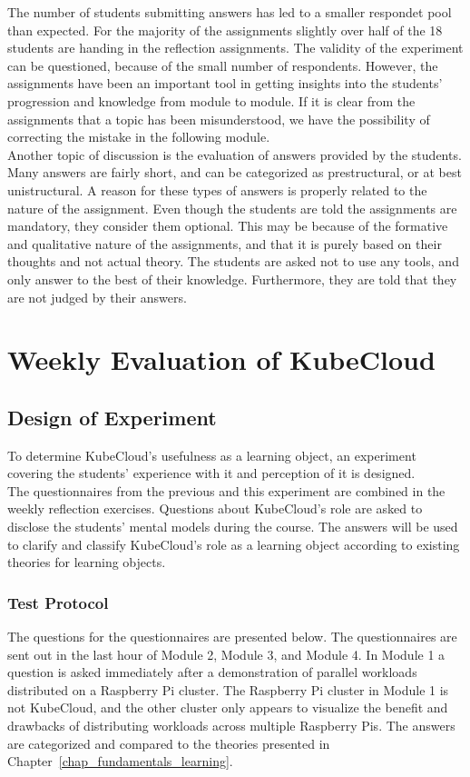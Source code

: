 \noindent
The number of students submitting answers has led to a smaller respondet pool than expected. For the majority of the assignments slightly over half of the 18 students are handing in the reflection assignments. The validity of the experiment can be questioned, because of the small number of respondents. However, the assignments have been an important tool in getting insights into the students' progression and knowledge from module to module. If it is clear from the assignments that a topic has been misunderstood, we have the possibility of correcting the mistake in the following module. \\

\noindent
Another topic of discussion is the evaluation of answers provided by the students. Many answers are fairly short, and can be categorized as prestructural, or at best unistructural. A reason for these types of answers is properly related to the nature of the assignment. Even though the students are told the assignments are mandatory, they consider them optional. This may be because of the formative and qualitative nature of the assignments, and that it is purely based on their thoughts and not actual theory. The students are asked not to use any tools, and only answer to the best of their knowledge. Furthermore, they are told that they are not judged by their answers.

\section{Weekly Evaluation of KubeCloud}
\subsection*{Design of Experiment}
To determine KubeCloud's usefulness as a learning object, an experiment covering the students' experience with it and perception of it is designed. \\

\noindent
The questionnaires from the previous and this experiment are combined in the weekly reflection exercises. Questions about KubeCloud's role are asked to disclose the students' mental models during the course. The answers will be used to clarify and classify KubeCloud's role as a learning object according to existing theories for learning objects.

\subsubsection*{Test Protocol}
The questions for the questionnaires are presented below. The questionnaires are sent out in the last hour of Module 2, Module 3, and Module 4. In Module 1 a question is asked immediately after a demonstration of parallel workloads distributed on a Raspberry Pi cluster. The Raspberry Pi cluster in Module 1 is not KubeCloud, and the other cluster only appears to visualize the benefit and drawbacks of distributing workloads across multiple Raspberry Pis. The answers are categorized and compared to the theories presented in Chapter~\ref{chap_fundamentals_learning}. \\

